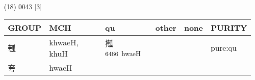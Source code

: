 \documentclass[14pt,a4paper]{scrartcl}
\begin{document}
(18) 0043 {[}3{]}

\begin{longtable}[c]{@{}llllll@{}}
\toprule
\begin{minipage}[b]{0.14\columnwidth}\raggedright\strut
GROUP
\strut\end{minipage} &
\begin{minipage}[b]{0.14\columnwidth}\raggedright\strut
MCH
\strut\end{minipage} &
\begin{minipage}[b]{0.14\columnwidth}\raggedright\strut
qu
\strut\end{minipage} &
\begin{minipage}[b]{0.14\columnwidth}\raggedright\strut
other
\strut\end{minipage} &
\begin{minipage}[b]{0.14\columnwidth}\raggedright\strut
none
\strut\end{minipage} &
\begin{minipage}[b]{0.14\columnwidth}\raggedright\strut
PURITY
\strut\end{minipage}\tabularnewline
\midrule
\endhead
\begin{minipage}[t]{0.14\columnwidth}\raggedright\strut
瓠
\strut\end{minipage} &
\begin{minipage}[t]{0.14\columnwidth}\raggedright\strut
khwaeH, khuH
\strut\end{minipage} &
\begin{minipage}[t]{0.14\columnwidth}\raggedright\strut
摦\textsuperscript{6466~hwaeH}
\strut\end{minipage} &
\begin{minipage}[t]{0.14\columnwidth}\raggedright\strut
\strut\end{minipage} &
\begin{minipage}[t]{0.14\columnwidth}\raggedright\strut
\strut\end{minipage} &
\begin{minipage}[t]{0.14\columnwidth}\raggedright\strut
pure:qu
\strut\end{minipage}\tabularnewline
\begin{minipage}[t]{0.14\columnwidth}\raggedright\strut
夸
\strut\end{minipage} &
\begin{minipage}[t]{0.14\columnwidth}\raggedright\strut
hwaeH
\strut\end{minipage} &
\begin{minipage}[t]{0.14\columnwidth}\raggedright\strut

\end{minipage}
\end{longtable}
\end{document}
